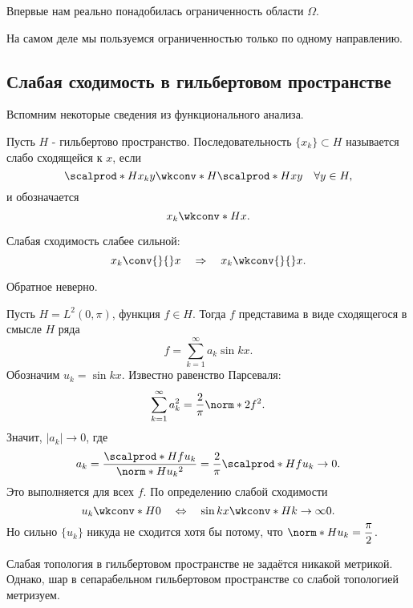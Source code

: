 \begin{note}
Впервые нам реально понадобилась ограниченность области $\Omega$.
\end{note}

\begin{note}
На самом деле мы пользуемся ограниченностью только по одному направлению. 
\end{note}

\subsection{Слабая сходимость в гильбертовом пространстве}
Вспомним некоторые сведения из функционального анализа.
\begin{definition}
Пусть $H$ - гильбертово пространство. Последовательность $\{x_k \} \subset H$ называется слабо сходящейся к $x$, если
$$\scalprod*{H}{x_k}{y} \wkconv*{H}{} \scalprod*{H}{x}{y} \quad \forall y \in H,$$
и обозначается
$$ x_k \wkconv*{H}{} x.$$
\end{definition}

\begin{note}
Слабая сходимость слабее сильной:
$$ x_k \conv{}{} x \quad \Rightarrow \quad x_k \wkconv{}{} x.$$
\end{note}

\begin{note}
Обратное неверно.
\end{note}

\begin{example} Пусть $H = L^2(0, \pi)$, функция $f \in H$. Тогда $f$ представима в виде сходящегося в смысле $H$ ряда
$$ f = \sum_{k=1}^\infty a_k \sin kx.$$
Обозначим $u_k = \sin kx$. Известно равенство Парсеваля:
$$ \sum_{k=1}^\infty a_k^2 = \frac {2} {\pi} \norm*{2}{f}^2.$$
Значит, $|a_k| \to 0$, где
$$ a_k = \frac {\scalprod*{H}{f}{u_k}} {\norm*{H}{u_k}^2} = \frac {2} {\pi} \scalprod*{H}{f}{u_k} \to 0.$$
Это выполняется для всех $f$. По определению слабой сходимости
$$ u_k \wkconv*{H}{} 0 \quad \Leftrightarrow \quad \sin kx \wkconv*{H}{k \to \infty} 0.$$
Но сильно $\{ u_k \}$ никуда не сходится хотя бы потому, что $\displaystyle \norm*{H}{u_k} = \frac {\pi} {2}$.
\end{example}

\begin{note}
Слабая топология в гильбертовом пространстве не задаётся никакой метрикой. Однако, шар в сепарабельном гильбертовом пространстве со слабой топологией метризуем.
\end{note}

